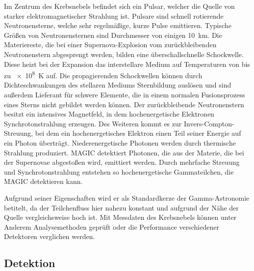 Im Zentrum des Krebsnebels befindet sich ein Pulsar,
welcher die Quelle von starker elektromagnetischer Strahlung ist.
Pulsare sind schnell rotierende Neutronensterne,
welche sehr regelmäßige, kurze Pulse emittieren.
Typische Größen von Neutronensternen sind Durchmesser von einigen
\SI{10}{\kilo\meter}.
Die Materiereste, die bei einer Supernova-Explosion
vom zurückbleibenden Neutronenstern abgesprengt werden,
bilden eine überschallschnelle Schockwelle.
Diese heizt bei der Expansion das interstellare Medium auf Temperaturen von bis zu
\SI{e8}{\kelvin} auf.
Die propagierenden Schockwellen können durch Dichteschwankungen des stellaren
Mediums Sternbildung auslösen
und sind außerdem Lieferant für schwere Elemente, die in einem normalen
Fusionsprozess eines Sterns nicht gebildet werden können.
Der zurückbleibende Neutronenstern besitzt ein intensives Magnetfeld,
in dem hochenergetische Elektronen Synchrotonstrahlung erzeugen.
Des Weiteren kommt es zur Invers-Compton-Streuung,
bei dem ein hochenergetisches Elektron einen Teil seiner
Energie auf ein Photon überträgt.
Niederenergetische Photonen werden durch thermische Strahlung produziert.
MAGIC detektiert Photonen,
die aus der Materie,
die bei der Supernovae abgestoßen wird,
emittiert werden.
Durch mehrfache Streuung und Synchrotonstrahlung entstehen so hochenergetische Gammateilchen,
die MAGIC detektieren kann.

Aufgrund seiner Eigenschaften wird er als Standardkerze der Gamma-Astronomie betitelt,
da der Teilchenfluss hier nahezu konstant und aufgrund der Nähe der Quelle vergleichsweise hoch ist.
Mit Messdaten des Krebsnebels können unter Anderem Analysemethoden geprüft
oder die Performance verschiedener Detektoren verglichen werden.

\subsection*{Detektion}%
\label{sub:wobbelmodus}



